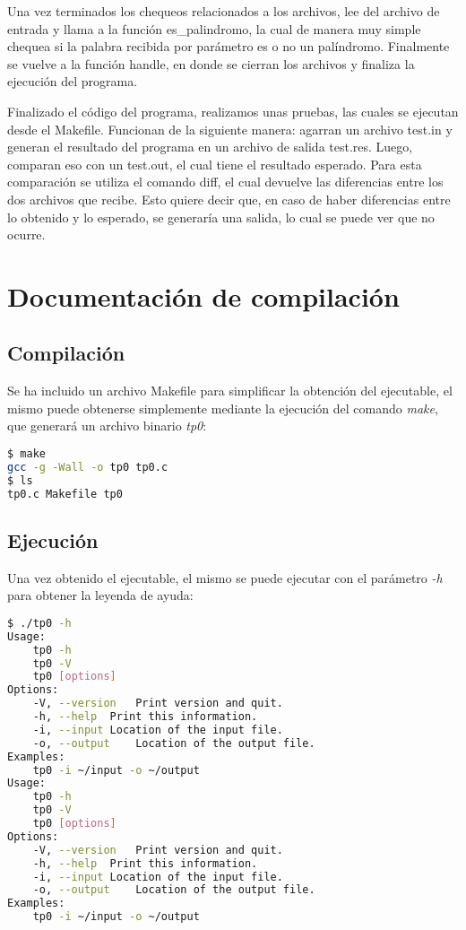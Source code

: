 \documentclass[10pt,a4paper]{article}
\begin{document}
Una vez terminados los chequeos relacionados a los archivos, lee del archivo de entrada y llama a la función es\_palindromo, la cual de manera muy simple chequea si la palabra recibida por parámetro es o no un palíndromo. Finalmente se vuelve a la función handle, en donde se cierran los archivos y finaliza la ejecución del programa.

Finalizado el código del programa, realizamos unas pruebas, las cuales se ejecutan desde el Makefile. Funcionan de la siguiente manera: agarran un archivo test.in y generan el resultado del programa en un archivo de salida test.res. Luego, comparan eso con un test.out, el cual tiene el resultado esperado. Para esta comparación se utiliza el comando diff, el cual devuelve las diferencias entre los dos archivos que recibe. Esto quiere decir que, en caso de haber diferencias entre lo obtenido y lo esperado, se generaría una salida, lo cual se puede ver que no ocurre.

\newpage

\section{Documentación de compilación}

\subsection{Compilación}

\lstset{
	breaklines=true,
  	basicstyle=\footnotesize,
}

Se ha incluido un archivo Makefile para simplificar la obtención del ejecutable, el mismo puede obtenerse simplemente mediante la ejecución del comando \textit{make}, que generará un archivo binario \textit{tp0}:

\begin{lstlisting}[language=bash]
$ make
gcc -g -Wall -o tp0 tp0.c 
$ ls
tp0.c Makefile tp0 
\end{lstlisting}

\subsection{Ejecución}

Una vez obtenido el ejecutable, el mismo se puede ejecutar con el parámetro \textit{-h} para obtener la leyenda de ayuda:

\begin{lstlisting}[language=bash]
$ ./tp0 -h
Usage:
	tp0 -h
	tp0 -V
	tp0 [options]
Options:
	-V, --version	Print version and quit.
	-h, --help	Print this information.
	-i, --input	Location of the input file.
	-o, --output	Location of the output file.
Examples:
	tp0 -i ~/input -o ~/output
Usage:
	tp0 -h
	tp0 -V
	tp0 [options]
Options:
	-V, --version	Print version and quit.
	-h, --help	Print this information.
	-i, --input	Location of the input file.
	-o, --output	Location of the output file.
Examples:
	tp0 -i ~/input -o ~/output

\end{lstlisting}
\end{document}
